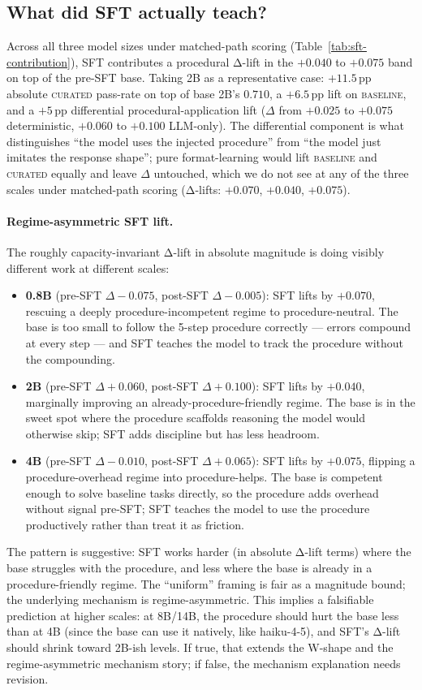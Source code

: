 \documentclass[10pt]{article}
\newcommand{\BL}{\textsc{baseline}\xspace}
\newcommand{\CU}{\textsc{curated}\xspace}
\begin{document}
\subsection{What did SFT actually teach?}\label{sec:what-sft-taught}
Across all three model sizes under matched-path scoring (Table~\ref{tab:sft-contribution}), SFT contributes a procedural Δ-lift in the $+0.040$ to $+0.075$ band on top of the pre-SFT base. Taking 2B as a representative case: $+11.5$\,pp absolute \CU{} pass-rate on top of base 2B's $0.710$, a $+6.5$\,pp lift on \BL{}, and a $+5$\,pp differential procedural-application lift ($\Delta$ from $+0.025$ to $+0.075$ deterministic, $+0.060$ to $+0.100$ LLM-only). The differential component is what distinguishes ``the model uses the injected procedure'' from ``the model just imitates the response shape''; pure format-learning would lift \BL{} and \CU{} equally and leave $\Delta$ untouched, which we do not see at any of the three scales under matched-path scoring (Δ-lifts: $+0.070$, $+0.040$, $+0.075$).

\paragraph{Regime-asymmetric SFT lift.} The roughly capacity-invariant Δ-lift in absolute magnitude is doing visibly different work at different scales:
\begin{itemize}[leftmargin=*, nosep]
  \item \textbf{0.8B} (pre-SFT $\Delta -0.075$, post-SFT $\Delta -0.005$): SFT lifts by $+0.070$, rescuing a deeply procedure-incompetent regime to procedure-neutral. The base is too small to follow the 5-step procedure correctly --- errors compound at every step --- and SFT teaches the model to track the procedure without the compounding.
  \item \textbf{2B} (pre-SFT $\Delta +0.060$, post-SFT $\Delta +0.100$): SFT lifts by $+0.040$, marginally improving an already-procedure-friendly regime. The base is in the sweet spot where the procedure scaffolds reasoning the model would otherwise skip; SFT adds discipline but has less headroom.
  \item \textbf{4B} (pre-SFT $\Delta -0.010$, post-SFT $\Delta +0.065$): SFT lifts by $+0.075$, flipping a procedure-overhead regime into procedure-helps. The base is competent enough to solve baseline tasks directly, so the procedure adds overhead without signal pre-SFT; SFT teaches the model to use the procedure productively rather than treat it as friction.
\end{itemize}
The pattern is suggestive: SFT works harder (in absolute Δ-lift terms) where the base struggles with the procedure, and less where the base is already in a procedure-friendly regime. The ``uniform'' framing is fair as a magnitude bound; the underlying mechanism is regime-asymmetric. This implies a falsifiable prediction at higher scales: at 8B/14B, the procedure should hurt the base less than at 4B (since the base can use it natively, like haiku-4-5), and SFT's Δ-lift should shrink toward 2B-ish levels. If true, that extends the W-shape and the regime-asymmetric mechanism story; if false, the mechanism explanation needs revision.
\end{document}

